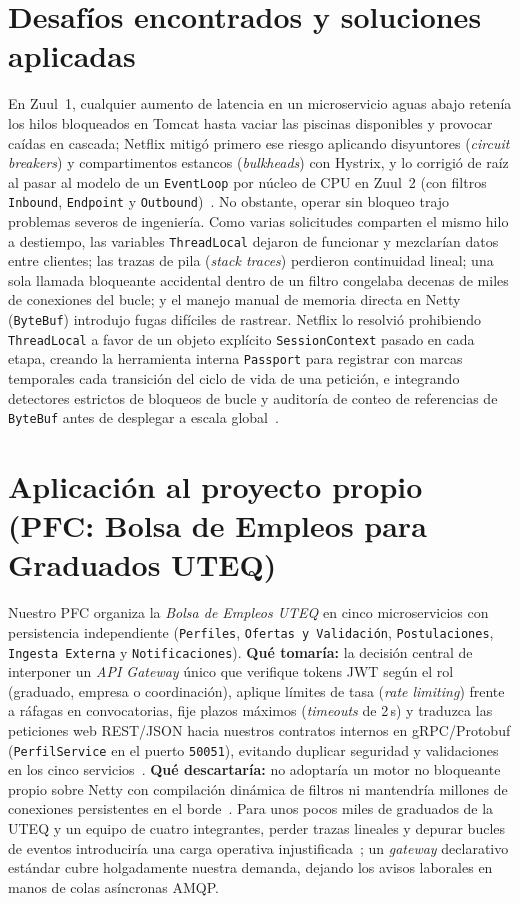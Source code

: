 \documentclass[10pt,a4paper]{article}
\begin{document}
\section{Desafíos encontrados y soluciones aplicadas}
En Zuul~1, cualquier aumento de latencia en un microservicio aguas abajo retenía los hilos bloqueados en Tomcat hasta vaciar las piscinas disponibles y provocar caídas en cascada; Netflix mitigó primero ese riesgo aplicando disyuntores (\emph{circuit breakers}) y compartimentos estancos (\emph{bulkheads}) con Hystrix, y lo corrigió de raíz al pasar al modelo de un \texttt{EventLoop} por núcleo de CPU en Zuul~2 (con filtros \texttt{Inbound}, \texttt{Endpoint} y \texttt{Outbound})~\cite{gonigberg2016zuul2,netflix2018opensourcing}. No obstante, operar sin bloqueo trajo problemas severos de ingeniería. Como varias solicitudes comparten el mismo hilo a destiempo, las variables \texttt{ThreadLocal} dejaron de funcionar y mezclarían datos entre clientes; las trazas de pila (\emph{stack traces}) perdieron continuidad lineal; una sola llamada bloqueante accidental dentro de un filtro congelaba decenas de miles de conexiones del bucle; y el manejo manual de memoria directa en Netty (\texttt{ByteBuf}) introdujo fugas difíciles de rastrear. Netflix lo resolvió prohibiendo \texttt{ThreadLocal} a favor de un objeto explícito \texttt{SessionContext} pasado en cada etapa, creando la herramienta interna \texttt{Passport} para registrar con marcas temporales cada transición del ciclo de vida de una petición, e integrando detectores estrictos de bloqueos de bucle y auditoría de conteo de referencias de \texttt{ByteBuf} antes de desplegar a escala global~\cite{gonigberg2016zuul2}.

\section{Aplicación al proyecto propio (PFC: Bolsa de Empleos para Graduados UTEQ)}
Nuestro PFC organiza la \emph{Bolsa de Empleos UTEQ} en cinco microservicios con persistencia independiente (\texttt{Perfiles}, \texttt{Ofertas y Validación}, \texttt{Postulaciones}, \texttt{Ingesta Externa} y \texttt{Notificaciones}). \textbf{Qué tomaría:} la decisión central de interponer un \emph{API Gateway} único que verifique tokens JWT según el rol (graduado, empresa o coordinación), aplique límites de tasa (\emph{rate limiting}) frente a ráfagas en convocatorias, fije plazos máximos (\emph{timeouts} de 2\,s) y traduzca las peticiones web REST/JSON hacia nuestros contratos internos en gRPC/Protobuf (\texttt{PerfilService} en el puerto \texttt{50051}), evitando duplicar seguridad y validaciones en los cinco servicios~\cite{haindl2024security,blinowski2022monolithic}. \textbf{Qué descartaría:} no adoptaría un motor no bloqueante propio sobre Netty con compilación dinámica de filtros ni mantendría millones de conexiones persistentes en el borde~\cite{gonigberg2016zuul2,dhawan2026gateway}. Para unos pocos miles de graduados de la UTEQ y un equipo de cuatro integrantes, perder trazas lineales y depurar bucles de eventos introduciría una carga operativa injustificada~\cite{blinowski2022monolithic}; un \emph{gateway} declarativo estándar cubre holgadamente nuestra demanda, dejando los avisos laborales en manos de colas asíncronas AMQP.
\end{document}
